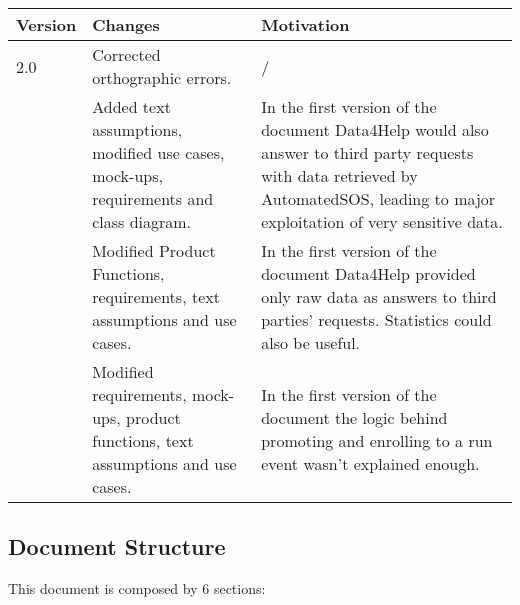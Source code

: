 \begin{table}[h]
\begin{tabular}{|l|p{}|p{}|}
\hline
Version & Changes & Motivation\\ \hline
2.0     & Corrected orthographic errors. & / \\ \hline
 & Added text assumptions, modified use cases, mock-ups, requirements and class diagram. & In the first version of the document Data4Help would also answer to third party requests with data retrieved by AutomatedSOS, leading to major exploitation of very sensitive data.   \\ \hline
 & Modified Product Functions, requirements, text assumptions and use cases. & In the first version of the document Data4Help provided only raw data as answers to third parties' requests. Statistics could also be useful.  \\ \hline
 & Modified requirements, mock-ups, product functions, text assumptions and use cases. & In the first version of the document the logic behind promoting and enrolling to a run event wasn't explained enough. \\ \hline
\end{tabular}
\end{table}

\clearpage
\subsection{Document Structure}
This document is composed by 6 sections:

